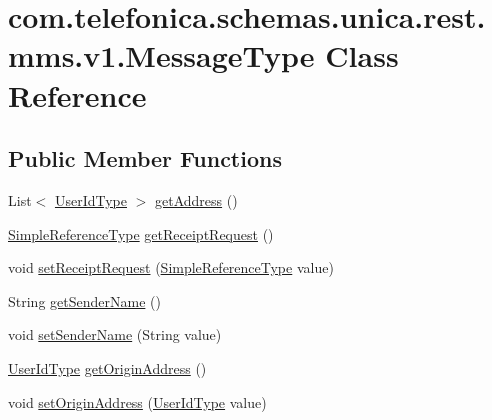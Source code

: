 \hypertarget{classcom_1_1telefonica_1_1schemas_1_1unica_1_1rest_1_1mms_1_1v1_1_1MessageType}{
\section{com.telefonica.schemas.unica.rest.mms.v1.MessageType Class Reference}
\label{classcom_1_1telefonica_1_1schemas_1_1unica_1_1rest_1_1mms_1_1v1_1_1MessageType}
}
\subsection*{Public Member Functions}
\begin{DoxyCompactItemize}
\item 
List$<$ \hyperlink{classcom_1_1telefonica_1_1schemas_1_1unica_1_1rest_1_1common_1_1v1_1_1UserIdType}{UserIdType} $>$ \hyperlink{classcom_1_1telefonica_1_1schemas_1_1unica_1_1rest_1_1mms_1_1v1_1_1MessageType_a9797b741b214b2b7c34f6717bfcfee75}{getAddress} ()
\item 
\hyperlink{classcom_1_1telefonica_1_1schemas_1_1unica_1_1rest_1_1common_1_1v1_1_1SimpleReferenceType}{SimpleReferenceType} \hyperlink{classcom_1_1telefonica_1_1schemas_1_1unica_1_1rest_1_1mms_1_1v1_1_1MessageType_a1bef052387d5caf650c8f797e5b11670}{getReceiptRequest} ()
\item 
void \hyperlink{classcom_1_1telefonica_1_1schemas_1_1unica_1_1rest_1_1mms_1_1v1_1_1MessageType_a66925a54a714fbbc86d577b92e4c7a74}{setReceiptRequest} (\hyperlink{classcom_1_1telefonica_1_1schemas_1_1unica_1_1rest_1_1common_1_1v1_1_1SimpleReferenceType}{SimpleReferenceType} value)
\item 
String \hyperlink{classcom_1_1telefonica_1_1schemas_1_1unica_1_1rest_1_1mms_1_1v1_1_1MessageType_a158822fd2410a40aa1a4f7851624f5e1}{getSenderName} ()
\item 
void \hyperlink{classcom_1_1telefonica_1_1schemas_1_1unica_1_1rest_1_1mms_1_1v1_1_1MessageType_a94c0ceea0532afb164e9861c9fef4f58}{setSenderName} (String value)
\item 
\hyperlink{classcom_1_1telefonica_1_1schemas_1_1unica_1_1rest_1_1common_1_1v1_1_1UserIdType}{UserIdType} \hyperlink{classcom_1_1telefonica_1_1schemas_1_1unica_1_1rest_1_1mms_1_1v1_1_1MessageType_a5da0bd62427766eeb8594f49c544794e}{getOriginAddress} ()
\item 
void \hyperlink{classcom_1_1telefonica_1_1schemas_1_1unica_1_1rest_1_1mms_1_1v1_1_1MessageType_ab3aab7f65998807a5f99e69ac02ff91d}{setOriginAddress} (\hyperlink{classcom_1_1telefonica_1_1schemas_1_1unica_1_1rest_1_1common_1_1v1_1_1UserIdType}{UserIdType} value)

\end{DoxyCompactItemize}
